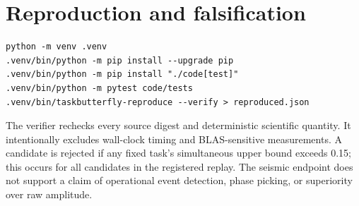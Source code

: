 \documentclass[11pt]{article}
\begin{document}
\section{Reproduction and falsification}

\begin{verbatim}
python -m venv .venv
.venv/bin/python -m pip install --upgrade pip
.venv/bin/python -m pip install "./code[test]"
.venv/bin/python -m pytest code/tests
.venv/bin/taskbutterfly-reproduce --verify > reproduced.json
\end{verbatim}

The verifier rechecks every source digest and deterministic scientific
quantity.  It intentionally excludes wall-clock timing and BLAS-sensitive
measurements.  A candidate is rejected if any fixed task's simultaneous upper
bound exceeds 0.15; this occurs for all candidates in the registered replay.
The seismic endpoint does not support a
claim of operational event detection, phase picking, or superiority over
raw amplitude.
\end{document}
